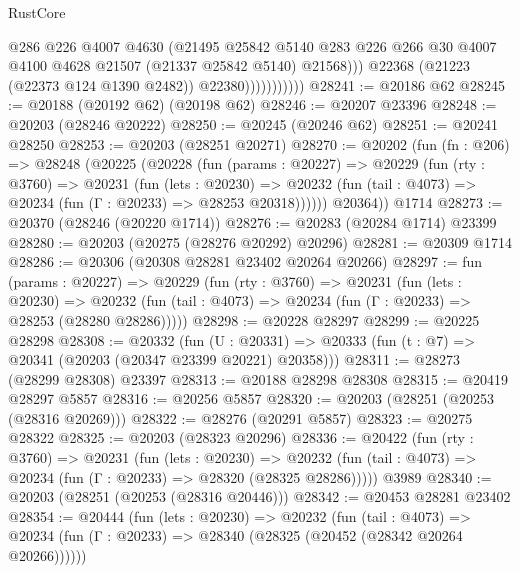 \begin{lexlean}{RustCore}
\begin{coremodule}
                              @286
                              @226
                              @4007
                              @4630
                              (@21495
                                @25842
                                @5140
                                @283
                                @226
                                @266
                                @30
                                @4007
                                @4100
                                @4628
                                @21507
                                (@21337 @25842 @5140)
                                @21568)))
                          @22368
                          (@21223 (@22373 @124 @1390 @2482))
                          @22380)))))))))))
@28241 := @20186 @62
@28245 := @20188 (@20192 @62) (@20198 @62)
@28246 := @20207 @23396
@28248 := @20203 (@28246 @20222)
@28250 := @20245 (@20246 @62)
@28251 := @20241 @28250
@28253 := @20203 (@28251 @20271)
@28270 := @20202
    (fun (fn : @206) =>
    @28248
      (@20225
        (@20228
          (fun (params : @20227) =>
          @20229
            (fun (rty : @3760) =>
            @20231
              (fun (lets : @20230) =>
              @20232 (fun (tail : @4073) => @20234 (fun (Γ : @20233) => @28253 @20318))))))
        @20364))
    @1714
@28273 := @20370 (@28246 (@20220 @1714))
@28276 := @20283 (@20284 @1714) @23399
@28280 := @20203 (@20275 (@28276 @20292) @20296)
@28281 := @20309 @1714
@28286 := @20306 (@20308 @28281 @23402 @20264 @20266)
@28297 := fun (params : @20227) =>
  @20229
    (fun (rty : @3760) =>
    @20231
      (fun (lets : @20230) =>
      @20232 (fun (tail : @4073) => @20234 (fun (Γ : @20233) => @28253 (@28280 @28286)))))
@28298 := @20228 @28297
@28299 := @20225 @28298
@28308 := @20332
    (fun (U : @20331) => @20333 (fun (t : @7) => @20341 (@20203 (@20347 @23399 @20221) @20358)))
@28311 := @28273 (@28299 @28308) @23397
@28313 := @20188 @28298 @28308
@28315 := @20419 @28297 @5857
@28316 := @20256 @5857
@28320 := @20203 (@28251 (@20253 (@28316 @20269)))
@28322 := @28276 (@20291 @5857)
@28323 := @20275 @28322
@28325 := @20203 (@28323 @20296)
@28336 := @20422
    (fun (rty : @3760) =>
    @20231
      (fun (lets : @20230) =>
      @20232 (fun (tail : @4073) => @20234 (fun (Γ : @20233) => @28320 (@28325 @28286)))))
    @3989
@28340 := @20203 (@28251 (@20253 (@28316 @20446)))
@28342 := @20453 @28281 @23402
@28354 := @20444
    (fun (lets : @20230) =>
    @20232
      (fun (tail : @4073) =>
      @20234 (fun (Γ : @20233) => @28340 (@28325 (@20452 (@28342 @20264 @20266))))))

\end{coremodule}
\end{lexlean}
